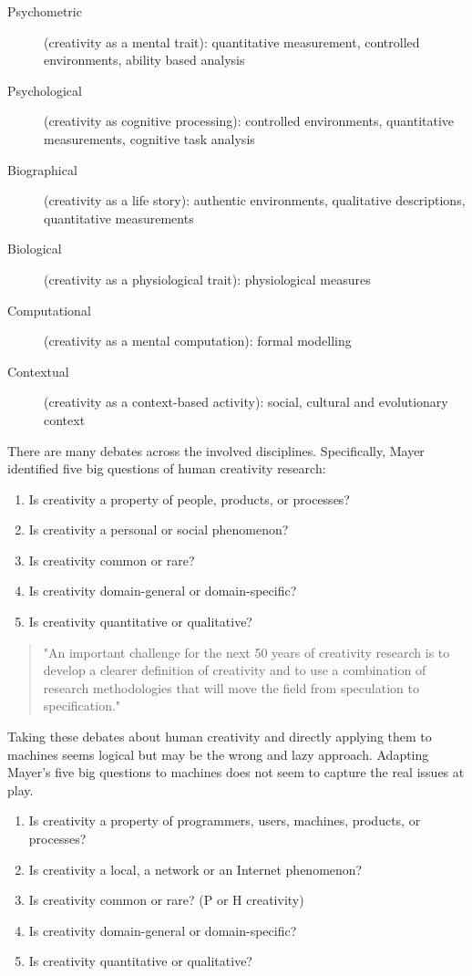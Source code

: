 \begin{description}
\item [Psychometric] (creativity as a mental trait): quantitative measurement, controlled environments, ability based analysis
\item [Psychological] (creativity as cognitive processing): controlled environments, quantitative measurements, cognitive task analysis
\item [Biographical] (creativity as a life story): authentic environments, qualitative descriptions, quantitative measurements
\item [Biological] (creativity as a physiological trait): physiological measures
\item [Computational] (creativity as a mental computation): formal modelling
\item [Contextual] (creativity as a context-based activity): social, cultural and evolutionary context
\end{description}

There are many debates across the involved disciplines. Specifically, Mayer identified five big questions of human creativity research: \citep[p.450-451]{Mayer1999}

\begin{enumerate}
\item Is creativity a property of people, products, or processes?
\item Is creativity a personal or social phenomenon?
\item Is creativity common or rare?
\item Is creativity domain-general or domain-specific?
\item Is creativity quantitative or qualitative?
\end{enumerate}

\begin{quote}
"An important challenge for the next 50 years of creativity research is to develop a clearer definition of creativity and to use a combination of research methodologies that will move the field from speculation to specification." \citep[p.459]{Mayer1999}
\end{quote}

Taking these debates about human creativity and directly applying them to machines seems logical but may be the wrong and lazy approach. Adapting Mayer’s five big questions to machines does not seem to capture the real issues at play.

\begin{enumerate}
\item Is creativity a property of programmers, users, machines, products, or processes?
\item Is creativity a local, a network or an Internet phenomenon?
\item Is creativity common or rare? (P or H creativity)
\item Is creativity domain-general or domain-specific?
\item Is creativity quantitative or qualitative?
\end{enumerate}


